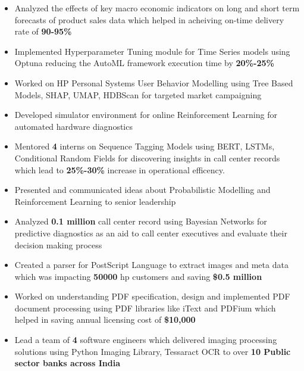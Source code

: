 \documentclass[10pt,a4paper,ragged2e,withhyper]{altacv}
\begin{document}
\begin{paracol}{1}
\par\divider
{}

\begin{itemize}
\item Analyzed the effects of key macro economic indicators on long and short
term forecasts of product sales data which helped in acheiving on-time
delivery rate of \textbf{\textbf{90-95\%}}
\item Implemented Hyperparameter Tuning module for Time Series models using Optuna
reducing the AutoML framework execution time by \textbf{\textbf{20\%-25\%}}
\item Worked on HP Personal Systems User Behavior Modelling using Tree Based Models,
SHAP, UMAP, HDBScan for targeted market campaigning
\item Developed simulator environment for online Reinforcement Learning for
automated hardware diagnostics
\item Mentored \textbf{\textbf{4}} interns on Sequence Tagging Models using BERT, LSTMs,
Conditional Random Fields for discovering insights in call center records
which lead to \textbf{\textbf{25\%-30\%}} increase in operational efficency.
\item Presented and communicated ideas about Probabilistic Modelling and
Reinforcement Learning to senior leadership
\item Analyzed \textbf{\textbf{0.1 million}} call center record using Bayesian Networks for predictive
diagnostics as an aid to call center executives and evaluate their decision
making process
\end{itemize}


\par\divider
{}
\begin{itemize}
\item Created a parser for PostScript Language to extract images and
meta data which was impacting \textbf{\textbf{50000}} hp customers and saving \textbf{\textbf{\$0.5 million}}
\item Worked on understanding PDF specification, design and implemented PDF document
processing using PDF libraries like iText and PDFium which helped in saving
annual licensing cost of \textbf{\textbf{\$10,000}}
\item Lead a team of \textbf{\textbf{4}} software engineers which delivered imaging processing solutions using
Python Imaging Library, Tessaract OCR to over \textbf{\textbf{10 Public sector banks across India}}
\end{itemize}


\end{paracol}
\end{document}

